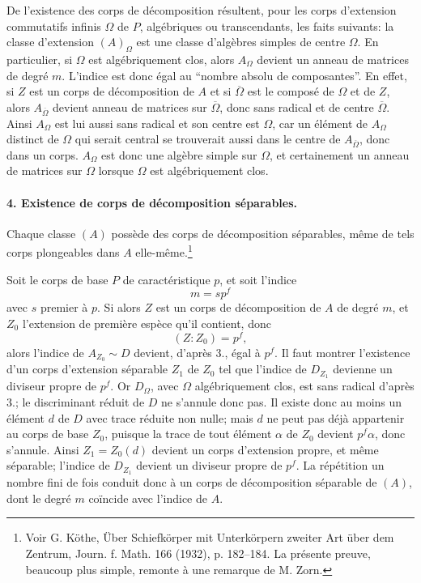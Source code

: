 De l'existence des corps de décomposition résultent, pour les corps d'extension commutatifs infinis \(\Omega\) de \(P\), algébriques ou transcendants, les faits suivants: la classe d'extension \((A)_\Omega\) est une classe d'algèbres simples de centre \(\Omega\). En particulier, si \(\Omega\) est algébriquement clos, alors \(A_\Omega\) devient un anneau de matrices de degré \(m\). L'indice est donc égal au ``nombre absolu de composantes''. En effet, si \(Z\) est un corps de décomposition de \(A\) et si \(\overline\Omega\) est le composé de \(\Omega\) et de \(Z\), alors \(A_{\overline\Omega}\) devient anneau de matrices sur \(\overline\Omega\), donc sans radical et de centre \(\overline\Omega\). Ainsi \(A_\Omega\) est lui aussi sans radical et son centre est \(\Omega\), car un élément de \(A_\Omega\) distinct de \(\Omega\) qui serait central se trouverait aussi dans le centre de \(A_{\overline\Omega}\), donc dans un corps. \(A_\Omega\) est donc une algèbre simple sur \(\Omega\), et certainement un anneau de matrices sur \(\Omega\) lorsque \(\Omega\) est algébriquement clos.

\paragraph{4. Existence de corps de décomposition séparables.}
Chaque classe \((A)\) possède des corps de décomposition séparables, même de tels corps plongeables dans \(A\) elle-même.\footnote{Voir G. Köthe, Über Schiefkörper mit Unterkörpern zweiter Art über dem Zentrum, Journ. f. Math. 166 (1932), p. 182--184. La présente preuve, beaucoup plus simple, remonte à une remarque de M. Zorn.}

Soit le corps de base \(P\) de caractéristique \(p\), et soit l'indice
\[
        m=s p^f
\]
avec \(s\) premier à \(p\). Si alors \(Z\) est un corps de décomposition de \(A\) de degré \(m\), et \(Z_0\) l'extension de première espèce qu'il contient, donc
\[
        (Z:Z_0)=p^f,
\]
alors l'indice de \(A_{Z_0}\sim D\) devient, d'après 3., égal à \(p^f\). Il faut montrer l'existence d'un corps d'extension séparable \(Z_1\) de \(Z_0\) tel que l'indice de \(D_{Z_1}\) devienne un diviseur propre de \(p^f\). Or \(D_\Omega\), avec \(\Omega\) algébriquement clos, est sans radical d'après 3.; le discriminant réduit de \(D\) ne s'annule donc pas. Il existe donc au moins un élément \(d\) de \(D\) avec trace réduite non nulle; mais \(d\) ne peut pas déjà appartenir au corps de base \(Z_0\), puisque la trace de tout élément \(\alpha\) de \(Z_0\) devient \(p^f\alpha\), donc s'annule. Ainsi \(Z_1=Z_0(d)\) devient un corps d'extension propre, et même séparable; l'indice de \(D_{Z_1}\) devient un diviseur propre de \(p^f\). La répétition un nombre fini de fois conduit donc à un corps de décomposition séparable de \((A)\), dont le degré \(m\) coïncide avec l'indice de \(A\).

\clearpage
